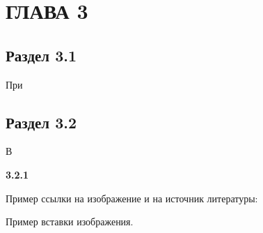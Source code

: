 \chapter[Глава 3]
{ГЛАВА 3}

\section{Раздел 3.1}\par
При 

\section{Раздел 3.2}\par
В 

\bf{3.2.1}  

Пример ссылки на изображение и на источник литературы:

Пример вставки изображения.
